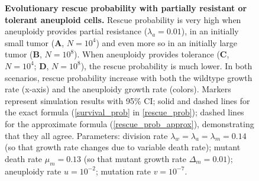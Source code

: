 \documentclass[12pt]{extarticle}
\begin{document}
\begin{figure}
\begin{subfigure}{0.5\textwidth}
\end{subfigure}
\caption{
\textbf{Evolutionary rescue probability with partially resistant or tolerant aneuploid cells.}
Rescue probability is very high when aneuploidy provides partial resistance ($\lambda_a=0.01$), in an initially small tumor (\textbf{A}, $N=10^4$) and even more so in an initially large tumor (\textbf{B}, $N=10^8$). 
When aneuploidy provides tolerance (\textbf{C}, $N=10^4$; \textbf{D}, $N=10^8$), the rescue probability is much lower. 
In both scenarios, rescue probability increase with both the wildtype growth rate (x-axis) and the aneuploidy growth rate (colors).
Markers represent simulation results with 95\% CI; solid and dashed lines for the exact formula (\cref{survival_prob} in \cref{rescue_prob}); dashed lines for the approximate formula (\cref{rescue_prob_approx}), demonstrating that they all agree.
Parameters: division rate $\lambda_w=\lambda_a=\lambda_m=0.14$ (so that growth rate changes due to variable death rate); mutant death rate $\mu_m=0.13$ (so that mutant growth rate $\Delta_m=0.01$); aneuploidy rate $u=10^{-2}$; mutation rate $v=10^{-7}$.
}
\label{rescue_prob_wt_growth}
\end{figure}
\end{document}
